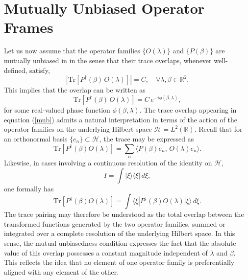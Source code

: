 \documentclass[aps,pra,onecolumn,nofootinbib,superscriptaddress,showpacs]{revtex4}
\begin{document}
\section{Mutually Unbiased Operator Frames}

\noindent Let us now assume that the operator families $\{O(\lambda)\}$ and
$\{P(\beta)\}$ are mutually unbiased in in the sense that
their trace overlaps, whenever well-defined, satisfy,
\begin{equation}\label{mub}
\left|\mathrm{Tr}[P^\dagger(\beta)\, O(\lambda)]\right| = C, \quad \forall \lambda,\beta \in \mathbb{R}^2.
\end{equation}
This implies that the overlap can be written as
\begin{equation}
\mathrm{Tr}[P^\dagger(\beta)\, O(\lambda)]
=
C\, e^{-i\phi(\beta,\lambda)},
\end{equation}
for some real-valued phase function $\phi(\beta,\lambda)$. The trace overlap appearing in equation (\ref{mub}) admits a natural
interpretation in terms of the action of the operator
families on the underlying Hilbert space
\(\mathcal H=L^2(\mathbb R)\). Recall that for an orthonormal basis $\{e_n\}\subset\mathcal H$, the trace may be
expressed as
\begin{equation}
\mathrm{Tr}[P^\dagger(\beta)O(\lambda)]
=
\sum_n
\langle P(\beta)e_n,\,O(\lambda)e_n\rangle.
\end{equation}
Likewise, in cases involving a continuous resolution of the identity on
$\mathcal H$,
\[
I=\int |\xi\rangle\langle\xi|\,d\xi,
\]
one formally has
\begin{equation}
\mathrm{Tr}[P^\dagger(\beta)O(\lambda)]
=
\int
\langle \xi|
P^\dagger(\beta)O(\lambda)
|\xi\rangle
\,d\xi.
\end{equation}
The trace pairing may therefore be understood as the total overlap
between the transformed functions generated by the two operator
families, summed or integrated over a complete resolution of the
underlying Hilbert space. In this sense, the mutual unbiasedness
condition expresses the fact that the absolute value of this overlap
possesses a constant magnitude independent of $\lambda$ and $\beta$.
This reflects the idea that no element of one operator family is
preferentially aligned with any element of the other.
\end{document}
